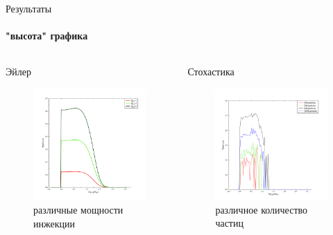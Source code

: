 \documentclass[8pt,pdf,hyperref={unicode},serif]{beamer}
\begin{document}
\begin{frame}{Результаты}
\framesubtitle{"высота" графика}
\begin{columns}
\begin{column}{0.5\textwidth}
Эйлер
\begin{figure}[H]
\centering
\includegraphics[width=0.90\linewidth]{r_Qinj}
\caption{различные мощности инжекции}
\end{figure}
\end{column}

\begin{column}{0.5\textwidth}
Стохастика
\begin{figure}[H]
\centering
\includegraphics[width=0.90\linewidth]{stoh_particles}
\caption{различное количество частиц}
\end{figure}
\end{column}
\end{columns}
\end{frame}
\end{document}
